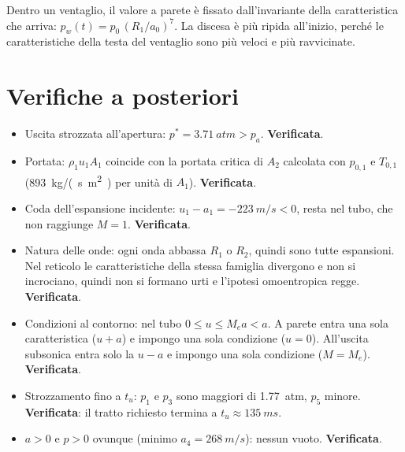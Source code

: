\documentclass[11pt,a4paper]{article}
\newcommand{\uma}{u-a}
\newcommand{\upa}{u+a}
\begin{document}
Dentro un ventaglio, il valore a parete è fissato dall'invariante della caratteristica che arriva:
$p_w(t)=p_0\,(R_1/a_0)^{7}$. La discesa è più ripida all'inizio, perché le caratteristiche della testa del
ventaglio sono più veloci e più ravvicinate.

\section{Verifiche a posteriori}
\begin{itemize}
\item Uscita strozzata all'apertura: $p^*=\SI{3.71}{atm}>p_a$. \textbf{Verificata}.
\item Portata: $\rho_1u_1A_1$ coincide con la portata critica di $A_2$ calcolata con $p_{0,1}$ e $T_{0,1}$
  (\SI{893}{kg/(s.m^2)} per unità di $A_1$). \textbf{Verificata}.
\item Coda dell'espansione incidente: $u_1-a_1=\SI{-223}{m/s}<0$, resta nel tubo, che non raggiunge $M=1$.
  \textbf{Verificata}.
\item Natura delle onde: ogni onda abbassa $R_1$ o $R_2$, quindi sono tutte espansioni. Nel reticolo le
  caratteristiche della stessa famiglia divergono e non si incrociano, quindi non si formano urti e l'ipotesi
  omoentropica regge. \textbf{Verificata}.
\item Condizioni al contorno: nel tubo $0\le u\le M_ea<a$. A parete entra una sola caratteristica ($\upa$) e
  impongo una sola condizione ($u=0$). All'uscita subsonica entra solo la $\uma$ e impongo una sola condizione
  ($M=M_e$). \textbf{Verificata}.
\item Strozzamento fino a $t_u$: $p_1$ e $p_3$ sono maggiori di \SI{1.77}{atm}, $p_5$ minore.
  \textbf{Verificata}: il tratto richiesto termina a $t_u\approx\SI{135}{ms}$.
\item $a>0$ e $p>0$ ovunque (minimo $a_4=\SI{268}{m/s}$): nessun vuoto. \textbf{Verificata}.
\end{itemize}

\end{document}
